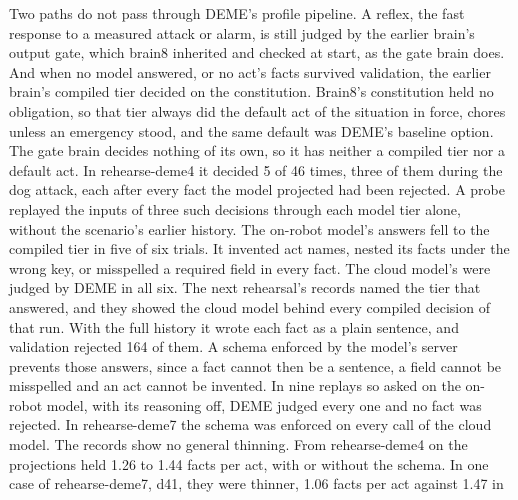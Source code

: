 Two paths do not pass through DEME's profile pipeline.
A reflex, the fast response to a measured attack or alarm, is still judged by the earlier brain's
output gate, which brain8 inherited and checked at start, as the gate brain does.
And when no model answered, or no act's facts survived validation, the earlier brain's compiled tier
decided on the constitution.
Brain8's constitution held no obligation, so that tier always did the default act of the situation in
force, chores unless an emergency stood, and the same default was DEME's baseline option. The gate
brain decides nothing of its own, so it has neither a compiled tier nor a default act.
In rehearse-deme4 it decided 5 of 46 times, three of them during the dog attack, each after every
fact the model projected had been rejected.
A probe replayed the inputs of three such decisions through each model tier alone, without the
scenario's earlier history.
The on-robot model's answers fell to the compiled tier in five of six trials. It invented act
names, nested its facts under the wrong key, or misspelled a required field in every fact.
The cloud model's were judged by DEME in all six.
The next rehearsal's records named the tier that answered, and they showed the cloud model behind
every compiled decision of that run. With the full history it wrote each fact as a plain sentence,
and validation rejected 164 of them.
A schema enforced by the model's server prevents those answers, since a fact cannot then be a
sentence, a field cannot be misspelled and an act cannot be invented. In nine replays so asked on
the on-robot model, with its reasoning off, DEME judged every one and no fact was rejected.
In rehearse-deme7 the schema was enforced on every call of the cloud model.
The records show no general thinning. From rehearse-deme4 on the projections held 1.26 to 1.44
facts per act, with or without the schema.
In one case of rehearse-deme7, d41, they were thinner, 1.06 facts per act against 1.47 in
